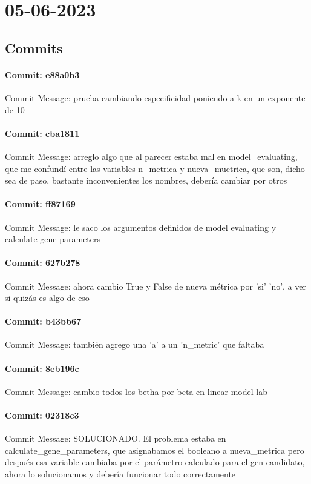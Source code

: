 \documentclass{article}
\begin{document}
\section{05-06-2023}
\subsection{Commits}
\paragraph{Commit: e88a0b3}
Commit Message: prueba cambiando especificidad poniendo a k en un exponente de 10

\paragraph{Commit: cba1811}
Commit Message: arreglo algo que al parecer estaba mal en model_evaluating, que me confundí entre las variables n_metrica y nueva_muetrica, que son, dicho sea de paso, bastante inconvenientes los nombres, debería cambiar por otros

\paragraph{Commit: ff87169}
Commit Message: le saco los argumentos definidos de model evaluating y calculate gene parameters

\paragraph{Commit: 627b278}
Commit Message: ahora cambio True y False de nueva métrica por 'si' 'no', a ver si quizás es algo de eso

\paragraph{Commit: b43bb67}
Commit Message: también agrego una 'a' a un 'n_metric' que faltaba

\paragraph{Commit: 8eb196c}
Commit Message: cambio todos los betha por beta en linear model lab

\paragraph{Commit: 02318c3}
Commit Message: SOLUCIONADO. El problema estaba en calculate_gene_parameters, que asignabamos el booleano a nueva_metrica pero después esa variable cambiaba por el parámetro calculado para el gen candidato, ahora lo solucionamos y debería funcionar todo correctamente
\end{document}
